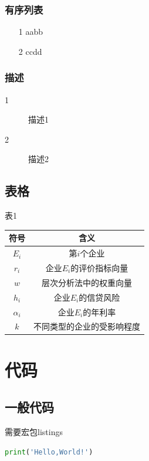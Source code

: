 \documentclass[utf8]{ctexart}
\begin{document}
\subsubsection{有序列表}
\begin{enumerate}
  \item[1] aabb
  \item[2] ccdd 
\end{enumerate}

\subsubsection{描述}
\begin{description}
  \item[1] 描述1
  \item[2] 描述2 
\end{description}

\subsection{表格}
\begin{table}[htbp]
  \begin{center}
  
  \setlength\tabcolsep{40pt} %
  表1
  
  \renewcommand{\arraystretch}{1.4} %
  \begin{tabular}{c c} %
  \hline %
  符号     & 含义                  \\ \hline
  $E_i$ & 第$i$个企业     \\  
  $r_i$      & 企业$E_i$的评价指标向量      \\  
  $w$      & 层次分析法中的权重向量        \\  
  $h_i$      & 企业$E_i$的信贷风险 \\ 
  $\alpha_i$      &企业$E_i$的年利率         \\ 
  $k$      & 不同类型的企业的受影响程度    \\ 
   \hline
  \end{tabular}
  
  \end{center}
\end{table}

\section{代码}
\subsection{一般代码}
需要宏包listings
\begin{lstlisting}[language=python]
  print('Hello,World!')
\end{lstlisting}
\end{document}
